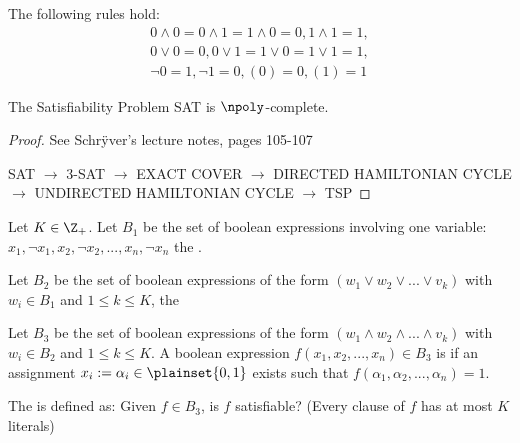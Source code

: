 The following rules hold: \begin{align*}
	0 \wedge 0 = 0 \wedge 1 = 1 \wedge 0 = 0, 1 \wedge 1 = 1,\\
	0\vee 0 = 0, 0 \vee 1 = 1 \vee 0 = 1\vee 1=1,\\
	\neg 0 = 1, \neg 1 = 0, (0) = 0, (1) = 1
\end{align*}

\begin{thm}
	The Satisfiability Problem SAT is $\npoly$-complete.
\end{thm}
\begin{proof}
	See Schr\"yver's lecture notes, pages 105-107
	
	SAT $\rightarrow$ 3-SAT $\rightarrow$ EXACT COVER $\rightarrow$ DIRECTED HAMILTONIAN CYCLE $\rightarrow$ UNDIRECTED HAMILTONIAN CYCLE $\rightarrow$ TSP
\end{proof}

\begin{defn}
Let $K \in \Z_+$. Let $B_1$ be the set of boolean expressions involving one variable: $x_1, \neg x_1, x_2, \neg x_2, ...,x_n, \neg x_n$ the .

Let $B_2$ be the set of boolean expressions of the form $(w_1 \vee w_2 \vee ... \vee v_k)$ with $w_i \in B_1$ and $1 \leq k \leq K$, the 

Let $B_3$ be the set of boolean expressions of the form $(w_1 \wedge w_2 \wedge ... \wedge v_k)$ with $w_i \in B_2$ and $1 \leq k \leq K$. A boolean expression $f(x_1, x_2, ..., x_n)\in B_3$ is  if an assignment $x_i:=\alpha_i\in\plainset{0,1}$ exists such that $f(\alpha_1, \alpha_2, ..., \alpha_n) = 1$.

The  is defined as: Given $f \in B_3$, is $f$ satisfiable? (Every clause of $f$ has at most $K$ literals)
\end{defn}

